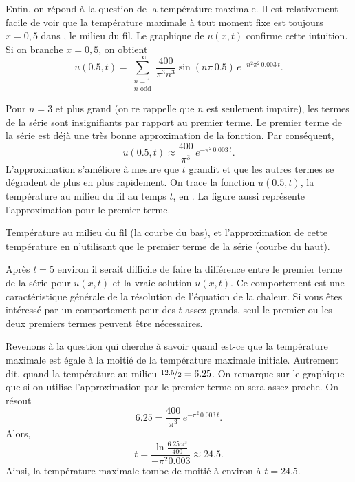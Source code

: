 \begin{example}
Enfin,  on répond à la question de la température maximale.  Il est
relativement facile de voir
que la température maximale à tout moment fixe est toujours $ x = 0,5 $ dans ,
le milieu du fil.  Le graphique de $ u (x, t) $ confirme cette intuition.
Si on branche $ x = 0,5 $,  on obtient
\begin{equation*}
u(0.5,t) = 
\sum_{\substack{n=1 \\ n \text{ odd}}}^\infty
\frac{400}{\pi^3 n^3}
\sin (n \pi\, 0.5 )
\, e^{-n^2 \pi^2 \, 0.003 \, t} .
\end{equation*}

Pour $n=3$ et plus grand (on re rappelle que $n$ est seulement impaire),  les termes
de la série
sont insignifiants par rapport au premier terme.
Le premier terme de la série est déjà une très bonne approximation
de la fonction.
Par conséquent,
\begin{equation*}
u(0.5,t) \approx
\frac{400}{\pi^3}
\, e^{-\pi^2 \, 0.003 \, t} .
\end{equation*}
L'approximation s'améliore à mesure que $ t $ grandit et que les autres
termes se dégradent de plus en plus rapidement.
On trace la fonction $ u (0.5, t) $,  la température au milieu du fil
au temps $ t $,  en .  La figure aussi
représente l'approximation pour le premier terme.

\begin{myfig}
\capstart
{}
\caption{Température au milieu du fil (la courbe du bas),
et l'approximation de cette température en n'utilisant que le premier terme de
la série (courbe du haut). \label{heat:wireexmaxfig}}
\end{myfig}

Après $ t = 5 $ environ
il serait difficile de faire la différence
entre le premier terme de la série pour $ u (x, t) $ et
la vraie solution $ u (x, t) $.  Ce comportement
est une caractéristique générale de la résolution de l'équation de la chaleur.
Si vous êtes intéressé par un comportement pour des $ t $ assez grands,  seul le
premier ou les deux premiers termes peuvent être nécessaires.


Revenons à la question qui cherche à savoir quand est-ce que la température maximale est égale à la moitié de la
température maximale initiale.  Autrement dit,  quand la température
au milieu $\nicefrac{12.5}{2} = 6.25$.  On remarque sur le graphique que si on utilise
l'approximation par le premier terme on sera assez proche.  On résout 
\begin{equation*}
6.25 =
\frac{400}{\pi^3}
\, e^{-\pi^2 \, 0.003 \, t} .
\end{equation*}
Alors,
\begin{equation*}
t =
\frac{\ln \frac{6.25\,\pi^3}{400}}{-\pi^2 0.003}
\approx 24.5 .
\end{equation*}
Ainsi, la température maximale tombe de moitié à environ à $t=24.5$.
\end{example}

